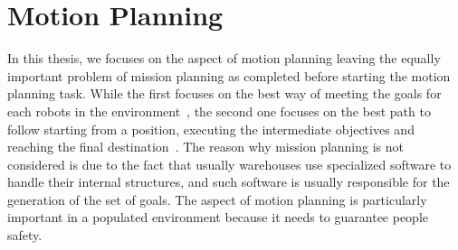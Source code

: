 \chapter{Motion Planning}
\label{ch:motionPlanning}
In this thesis, we focuses on the aspect of motion planning leaving the equally
important problem of mission planning as completed before starting the motion
planning task. While the first focuses on the best way of meeting the goals for
each robots in the environment~\cite{missionplanning}, the second one focuses
on the best path to follow starting from a position, executing the intermediate
objectives and reaching the final destination~\cite{motionplanning}. The reason
why mission planning is not considered is due to the fact that usually
warehouses use specialized software to handle their internal structures, and
such software is usually responsible for the generation of the set of goals. 
The aspect of motion planning is particularly important in a populated 
environment because it needs to guarantee people safety. 
%
%
%
